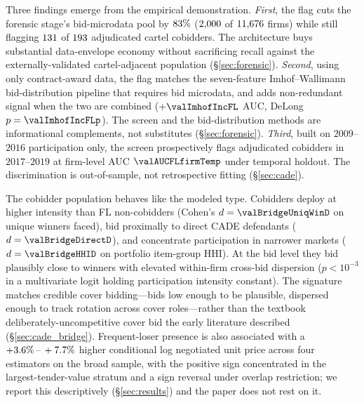 Three findings emerge from the empirical demonstration.
\textit{First}, the flag cuts the forensic stage's
bid-microdata pool by $83\%$
($2{,}000$ of $11{,}676$ firms) while still
flagging $131$ of $193$ adjudicated
cartel cobidders. The architecture buys substantial
data-envelope economy without sacrificing recall against the
externally-validated cartel-adjacent population
(\S\ref{sec:forensic}). \textit{Second}, using only
contract-award data, the flag matches the seven-feature
Imhof--Wallimann bid-distribution pipeline that requires bid
microdata, and adds non-redundant signal when the two are
combined ($+\valImhofIncFL$ AUC, DeLong
$p=\valImhofIncFLp$). The screen and the bid-distribution
methods are informational complements, not substitutes
(\S\ref{sec:forensic}). \textit{Third}, built on
$2009$--$2016$ participation only, the screen prospectively
flags adjudicated cobidders in $2017$--$2019$ at firm-level
AUC $\valAUCFLfirmTemp$ under temporal holdout. The
discrimination is out-of-sample, not retrospective fitting
(\S\ref{sec:cade}).

The cobidder population behaves like the modeled type.
Cobidders deploy at higher intensity than FL non-cobidders
(Cohen's $d=\valBridgeUniqWinD$ on unique winners faced), bid
proximally to direct CADE defendants ($d=\valBridgeDirectD$),
and concentrate participation in narrower markets
($d=\valBridgeHHID$ on portfolio item-group HHI). At the bid
level they bid plausibly close to winners with elevated
within-firm cross-bid dispersion ($p<10^{-3}$ in a multivariate
logit holding participation intensity constant). The signature
matches credible cover bidding---bids low enough to be
plausible, dispersed enough to track rotation across cover
roles---rather than the textbook deliberately-uncompetitive
cover bid the early literature described
(\S\ref{sec:cade_bridge}). Frequent-loser presence is also
associated with a $+3.6\%\,\text{--}\,+7.7\%$ higher conditional log
negotiated unit price across four estimators on the broad
sample, with the positive sign concentrated in the
largest-tender-value stratum and a sign reversal under overlap
restriction; we report this descriptively
(\S\ref{sec:results}) and the paper does not rest on it.

